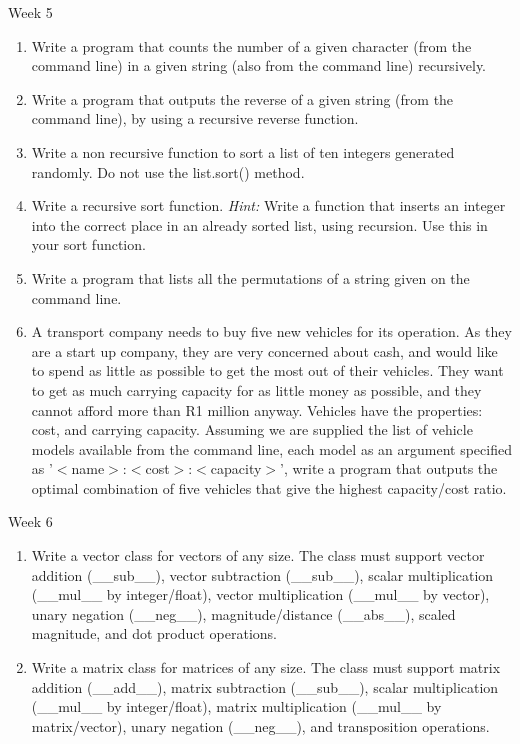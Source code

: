 \hypertarget{week5}{Week 5}
\begin{enumerate}
	\item Write a program that counts the number of a given character (from the command line) in a given string (also from the command line) recursively.
	\item Write a program that outputs the reverse of a given string (from the command line), by using a recursive reverse function.
	\item Write a non recursive function to sort a list of ten integers generated randomly. Do not use the list.sort() method.
	\item Write a recursive sort function. \textit{Hint:} Write a function that inserts an integer into the correct place in an already sorted list, using recursion. Use this in your sort function.
	\item Write a program that lists all the permutations of a string given on the command line.
	\item A transport company needs to buy five new vehicles for its operation. As they are a start up company, they are very concerned about cash, and would like to spend as little as possible to get the most out of their vehicles. They    want to get as much carrying capacity for as little money as possible, and they cannot afford more than R1 million anyway. Vehicles have the properties: cost, and carrying capacity. Assuming we are supplied the list of vehicle models available from    the command line, each model as an argument specified as '$<$name$>$:$<$cost$>$:$<$capacity$>$', write a program that outputs the optimal combination of five vehicles that give the highest capacity/cost ratio.
\end{enumerate}

\hypertarget{week6}{Week 6}
\begin{enumerate}
	\item Write a vector class for vectors of any size. The class must support vector addition (\_\_sub\_\_), vector subtraction (\_\_sub\_\_), scalar multiplication (\_\_mul\_\_ by integer/float), vector multiplication (\_\_mul\_\_ by vector), unary    negation (\_\_neg\_\_), magnitude/distance (\_\_abs\_\_), scaled magnitude, and dot product operations.
	\item Write a matrix class for matrices of any size. The class must support matrix addition (\_\_add\_\_), matrix subtraction (\_\_sub\_\_), scalar multiplication (\_\_mul\_\_ by integer/float), matrix multiplication (\_\_mul\_\_ by matrix/vector),    unary negation (\_\_neg\_\_), and transposition operations.
\end{enumerate}   



